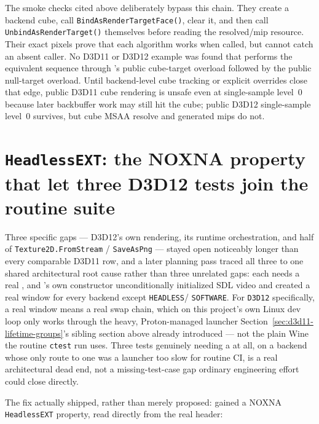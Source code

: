 The smoke checks cited above deliberately bypass this chain. They create a backend cube, call
\texttt{BindAsRenderTargetFace()}, clear it, and then call
\texttt{UnbindAsRenderTarget()} themselves before reading the resolved/mip resource. Their
exact pixels prove that each algorithm works when called, but cannot catch an absent caller.
No D3D11 or D3D12 example was found that performs the equivalent sequence through
's public cube-target overload followed by the public null-target
overload. Until backend-level cube tracking or explicit overrides close that edge, public
D3D11 cube rendering is unsafe even at single-sample level~0 because later backbuffer work may
still hit the cube; public D3D12 single-sample level~0 survives, but cube MSAA resolve and
generated mips do not.

\section[\texttt{HeadlessEXT}: letting three D3D12 tests join the routine suite]{\texttt{HeadlessEXT}: the NOXNA property that let three D3D12 tests join the
routine suite}

Three specific gaps --- D3D12's own  rendering, its  runtime
orchestration, and half of \texttt{Texture2D.FromStream} / \texttt{SaveAsPng} --- stayed open
noticeably longer than every comparable D3D11 row, and a later planning pass traced all three to
one shared architectural root cause rather than three unrelated gaps: each needs a real
, and 's own constructor unconditionally
initialized SDL video and created a real window for every backend except \texttt{HEADLESS}/%
\texttt{SOFTWARE}. For \texttt{D3D12} specifically, a real window means a real swap chain, which
on this project's own Linux dev loop only works through the heavy, Proton-managed launcher
Section~\ref{sec:d3d11-lifetime-groups}'s sibling section above already introduced --- not the
plain Wine the routine \texttt{ctest} run uses. Three tests genuinely needing a
 at all, on a backend whose only route to one was a launcher too slow for
routine CI, is a real architectural dead end, not a missing-test-case gap ordinary engineering
effort could close directly.

The fix actually shipped, rather than merely proposed:  gained a
NOXNA \texttt{HeadlessEXT} property, read directly from the real header:

